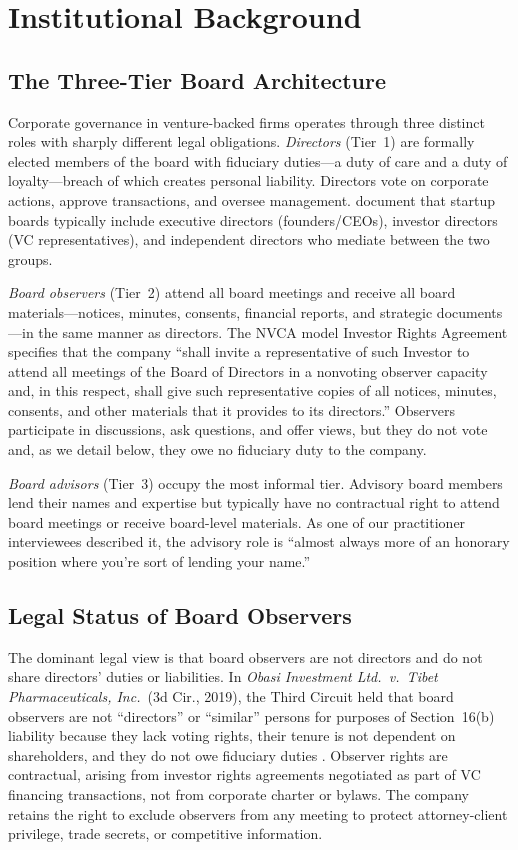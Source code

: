 \section{Institutional Background}
\label{sec:institutional}

\subsection{The Three-Tier Board Architecture}

Corporate governance in venture-backed firms operates through three distinct roles with sharply different legal obligations. \textit{Directors} (Tier~1) are formally elected members of the board with fiduciary duties---a duty of care and a duty of loyalty---breach of which creates personal liability. Directors vote on corporate actions, approve transactions, and oversee management. \citet{ewens2024board} document that startup boards typically include executive directors (founders/CEOs), investor directors (VC representatives), and independent directors who mediate between the two groups.

\textit{Board observers} (Tier~2) attend all board meetings and receive all board materials---notices, minutes, consents, financial reports, and strategic documents---in the same manner as directors. The NVCA model Investor Rights Agreement specifies that the company ``shall invite a representative of such Investor to attend all meetings of the Board of Directors in a nonvoting observer capacity and, in this respect, shall give such representative copies of all notices, minutes, consents, and other materials that it provides to its directors.'' Observers participate in discussions, ask questions, and offer views, but they do not vote and, as we detail below, they owe no fiduciary duty to the company.

\textit{Board advisors} (Tier~3) occupy the most informal tier. Advisory board members lend their names and expertise but typically have no contractual right to attend board meetings or receive board-level materials. As one of our practitioner interviewees described it, the advisory role is ``almost always more of an honorary position where you're sort of lending your name.''

\subsection{Legal Status of Board Observers}

The dominant legal view is that board observers are not directors and do not share directors' duties or liabilities. In \textit{Obasi Investment Ltd.\ v.\ Tibet Pharmaceuticals, Inc.}\ (3d Cir., 2019), the Third Circuit held that board observers are not ``directors'' or ``similar'' persons for purposes of Section~16(b) liability because they lack voting rights, their tenure is not dependent on shareholders, and they do not owe fiduciary duties \citep{packin2025board}. Observer rights are contractual, arising from investor rights agreements negotiated as part of VC financing transactions, not from corporate charter or bylaws. The company retains the right to exclude observers from any meeting to protect attorney-client privilege, trade secrets, or competitive information.

